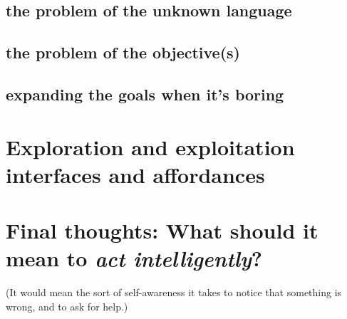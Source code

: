 \subsection{the problem of the unknown language}\hypertarget{the-problem-of-the-unknown-language}{}\label{the-problem-of-the-unknown-language}

\subsection{the problem of the objective(s)}\hypertarget{the-problem-of-the-objectives}{}\label{the-problem-of-the-objectives}

\subsection{expanding the goals when it's boring}\hypertarget{expanding-the-goals-when-its-boring}{}\label{expanding-the-goals-when-its-boring}

\section{Exploration and exploitation interfaces and affordances}\hypertarget{exploration-and-exploitation-interfaces-and-affordances}{}\label{exploration-and-exploitation-interfaces-and-affordances}

\section{Final thoughts: What should it mean to \emph{act intelligently}?}\hypertarget{final-thoughts-what-should-it-mean-to-act-intelligently}{}\label{final-thoughts-what-should-it-mean-to-act-intelligently}

(It would mean the sort of self-awareness it takes to notice that something is wrong, and to ask for help.)

